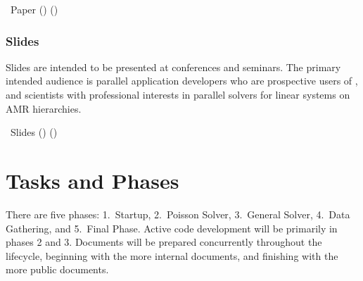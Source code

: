 \documentclass[11pt]{article}
\begin{document}
\BeginENUMERATE
  \item  \amrSolve\ Paper    () ()
\EndENUMERATE


\subsubsection{Slides} \label{sss:slides}

Slides are intended to be presented at conferences and seminars.  The
primary intended audience is parallel application developers who are
prospective users of \amrSolve, and scientists with professional
interests in parallel solvers for linear systems on AMR hierarchies.

\BeginENUMERATE
  \item  \amrSolve\ Slides   () ()
\EndENUMERATE

\section{Tasks and Phases}

There are five phases: 1.~Startup, 2.~Poisson Solver, 3.~General
Solver, 4.~Data Gathering, and 5.~Final Phase.  Active code
development will be primarily in phases 2 and 3.  Documents will be
prepared concurrently throughout the lifecycle, beginning with the
more internal documents, and finishing with the more public documents.
\end{document}
